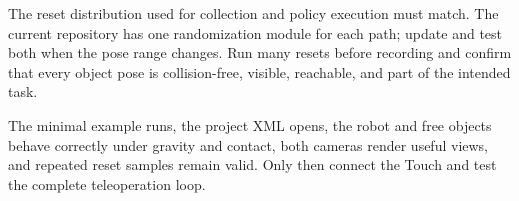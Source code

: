 The reset distribution used for collection and policy execution must match.
The current repository has one randomization module for each path; update and
test both when the pose range changes. Run many resets before recording and
confirm that every object pose is collision-free, visible, reachable, and part
of the intended task.

\begin{checkpointbox}
The minimal example runs, the project XML opens, the robot and free objects
behave correctly under gravity and contact, both cameras render useful views,
and repeated reset samples remain valid. Only then connect the Touch and test
the complete teleoperation loop.
\end{checkpointbox}

